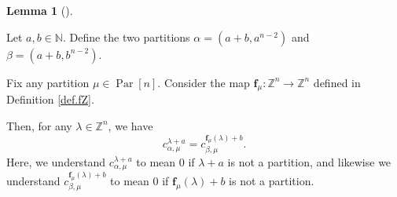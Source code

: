 \documentclass[numbers=enddot,12pt,final,onecolumn,notitlepage]{scrartcl}%
\theoremstyle{definition}
\newtheorem{lem}[theo]{Lemma}
\newenvironment{lemma}[1][]
{\begin{lem}[#1]\begin{leftbar}}
{\end{leftbar}\end{lem}}
\begin{document}
\begin{lemma}
\label{lem.finale.1}Let $a,b\in\mathbb{N}$. Define the two partitions
$\alpha=\left(  a+b,a^{n-2}\right)  $ and $\beta=\left(  a+b,b^{n-2}\right)  $.

Fix any partition $\mu\in\operatorname*{Par}\left[  n\right]  $. Consider the
map $\mathbf{f}_{\mu}:\mathbb{Z}^{n}\rightarrow\mathbb{Z}^{n}$ defined in
Definition \ref{def.fZ}.

Then, for any $\lambda\in\mathbb{Z}^{n}$, we have
\[
c_{\alpha,\mu}^{\lambda+a}=c_{\beta,\mu}^{\mathbf{f}_{\mu}\left(
\lambda\right)  +b}.
\]
Here, we understand $c_{\alpha,\mu}^{\lambda+a}$ to mean $0$ if $\lambda+a$ is
not a partition, and likewise we understand $c_{\beta,\mu}^{\mathbf{f}_{\mu
}\left(  \lambda\right)  +b}$ to mean $0$ if $\mathbf{f}_{\mu}\left(
\lambda\right)  +b$ is not a partition.
\end{lemma}
\end{document}
